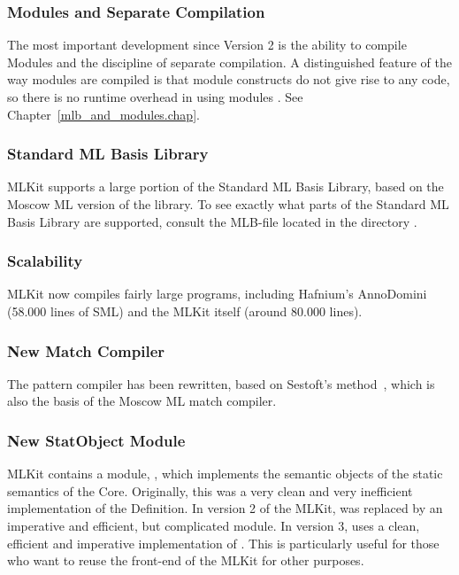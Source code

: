 \documentclass[12pt]{book}
\begin{document}
\subsubsection*{Modules and Separate Compilation}
The most important development since Version 2 is the ability to compile Modules
and the discipline of separate compilation. A distinguished feature of the way
modules are compiled is that module constructs do not give rise to any code, so
there is no runtime overhead in using modules
\cite{ElsmanICFP99,ElsmanThesis}. See Chapter~\ref{mlb_and_modules.chap}.

\subsubsection*{Standard ML Basis Library}
MLKit supports a large portion of the
%
%
%
Standard ML Basis Library, based on the Moscow ML version of the library. To see
exactly what parts of the Standard ML Basis Library are supported, consult the
MLB-file  located in the directory .

\subsubsection*{Scalability}
MLKit now compiles fairly large programs, including Hafnium's AnnoDomini
(58.000 lines of SML) and the MLKit itself (around 80.000 lines).

\subsubsection*{New Match Compiler}
The pattern compiler has been rewritten, based on Sestoft's
method~\cite{sestoft96}, which is also the basis of the Moscow ML match
compiler.

\subsubsection*{New StatObject Module}
MLKit contains a module,
%
%
%
, which implements the semantic objects of the static semantics
of the Core.  Originally, this was a very clean and very inefficient
implementation of the Definition. In version 2 of the MLKit,  was
replaced by an imperative and efficient, but complicated module.  In version 3,
 uses a clean, efficient and imperative implementation of
. This is particularly useful for those who want to reuse the
front-end of the MLKit for other purposes.
\end{document}

